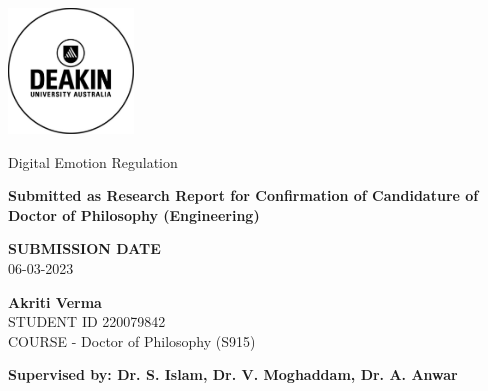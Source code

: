 \documentclass[12pt]{article}
\begin{document}
\onehalfspacing
\justifying
\thispagestyle{empty} 
\begin{titlepage}
    \includegraphics[width=0.25\textwidth]{Deakin_Logo.jpeg}
    \begin{center}
       \vspace*{4cm}
       {\LARGE Digital Emotion Regulation} %
       \vspace{3cm}
    \begin{large}   
    
        
        {\bf Submitted as Research Report for Confirmation of Candidature of Doctor of Philosophy (Engineering)}
       \vspace{1cm}
        
        {\bf SUBMISSION DATE} \\
        06-03-2023        
        
       \vspace{3cm}
       \textbf{Akriti Verma}\\
       STUDENT ID 220079842 \\
       COURSE - Doctor of Philosophy (S915)
       \vfill

       {\bf \normalsize Supervised by: Dr. S. Islam, Dr. V. Moghaddam, Dr. A. Anwar}\\
       
    \end{large}  
   \end{center}
\end{titlepage}

\newpage 
\thispagestyle{plain} 


\newpage
\begin{singlespacing}
\tableofcontents
\end{singlespacing}
\setlength{\parskip}{1em}
\renewcommand{\baselinestretch}{2.0}

\newpage
\listoffigures
\listoftables

\newpage 
{}
\setcounter{page}{1}
\onehalfspacing







% 
% 

\newpage
\singlespacing
\typeout{}

\end{document}
